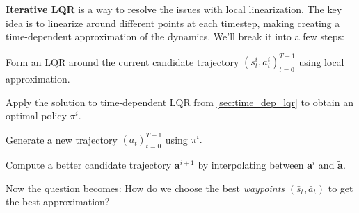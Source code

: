 \documentclass[../main/main]{subfiles}
\begin{document}
\textbf{Iterative LQR} is a way to resolve the issues with local linearization.
The key idea is to linearize around different points at each timestep, making creating a time-dependent approximation of the dynamics.
We'll break it into a few steps:
\begin{steps}
    \item Form an LQR around the current candidate trajectory $(\bar s^i_t, \bar a^i_t)_{t=0}^{T-1}$ using local approximation.
    \item Apply the solution to time-dependent LQR from \autoref{sec:time_dep_lqr} to obtain an optimal policy $\pi^i.$
    \item Generate a new trajectory $(\tilde a_t)_{t=0}^{T-1}$ using $\pi^i.$
    \item Compute a better candidate trajectory $\mathbf{a}^{i+1}$ by interpolating between $\mathbf{a}^i$ and $\tilde {\mathbf{a}}.$
\end{steps}
Now the question becomes: How do we choose the best \emph{waypoints} $(\bar s_t, \bar a_t)$ to get the best approximation?
\end{document}
